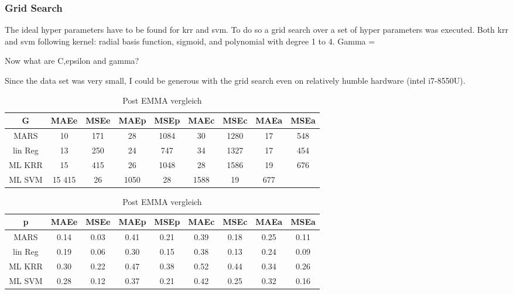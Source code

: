 %


\subsubsection{Grid Search}
The ideal hyper parameters have to be found for \gls{krr} and \gls{svm}.
To do so a grid search over a set of hyper parameters was executed. 
Both \gls{krr} and \gls{svm} following kernel: radial basis function, sigmoid, and polynomial with degree 1 to 4. 
Gamma = {




Now what are C,epsilon and gamma? 

Since the data set was very small, I could be generous with the grid search even on relatively humble hardware (intel i7-8550U). 

\begin{table}[htb]
	\centering
    \caption{Post EMMA vergleich}
	\label{tab:post-emma}
	\begin{tabular}{c cc cc cc cc}
    \hline\hline
    G&  MAEe&   MSEe&   MAEp&   MSEp&   MAEc&   MSEc&   MAEa& MSEa \\
    \hline
        MARS&   10& 171&    28& 1084&   30& 1280&   17& 548\\
        lin Reg&    13& 250&    24& 747&    34& 1327&   17& 454\\
        ML KRR& 15& 415&    26& 1048&   28& 1586&   19& 676\\
        ML SVM& 15  415&    26& 1050&   28& 1588&   19& 677\\
    \hline\hline
	\end{tabular}
	\begin{tabular}{c cc cc cc cc}
    \hline\hline
    p&  MAEe&   MSEe&   MAEp&   MSEp&   MAEc&   MSEc&   MAEa& MSEa \\
    \hline
        MARS&   0.14&   0.03&   0.41&   0.21&   0.39&   0.18&   0.25&   0.11\\
        lin Reg&    0.19&   0.06&   0.30&   0.15&   0.38&   0.13&   0.24&   0.09\\
        ML KRR& 0.30&   0.22&   0.47&   0.38&   0.52&   0.44&   0.34&   0.26\\
        ML SVM& 0.28&   0.12&   0.37&   0.21&   0.42&   0.25&   0.32&   0.16\\
    \hline\hline
	\end{tabular}
\end{table}
    

}
